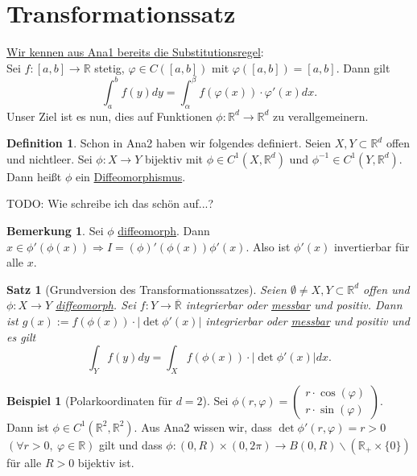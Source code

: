 \documentclass[a4paper]{scrreprt}
\newcommand{\R}{\mathbb{R}}
\newcommand{\Rq}{\overline{\R}}
\newcommand{\jlabel}[1]{\label{j_#1}}
\newcommand{\jhyperref}[2]{\hyperref[j_#1]{#2}}
\newcommand{\jlink}[1]{\jhyperref{#1}{#1}}
\newcommand{\jabb}[3]{ #1: #2 \rightarrow #3 }
\theoremstyle{plain}
\newtheorem*{satz*}{Satz}
\theoremstyle{definition}
\newtheorem*{defn*}{Definition}
\newtheorem*{expl*}{Beispiel}
\newtheorem*{bem*}{Bemerkung}
\begin{document}
{{{{    %
\section{Transformationssatz}
\uline{Wir kennen aus Ana1 bereits die Substitutionsregel}:\\
Sei $\jabb{f}{[a,b]}{\R}$ stetig, $\varphi \in C([a,b])$ mit $\varphi([a,b]) = [a,b]$. Dann gilt
\begin{displaymath}
    \int_a^b f(y) dy = \int_\alpha^\beta f(\varphi(x))\cdot \varphi'(x) dx.
\end{displaymath}
Unser Ziel ist es nun, dies auf Funktionen $\jabb{\phi}{\R^d}{\R^d}$ zu verallgemeinern.

\begin{defn*}
    \jlabel{Diffeomorphismus} \jlabel{diffeomorph}
    Schon in Ana2 haben wir folgendes definiert. Seien $X,Y\subset \R^d$ offen und nichtleer. Sei $\jabb{\phi}{X}{Y}$ bijektiv mit $\phi\in C^1(X,\R^d)$ und $\phi^{-1} \in C^1(Y,\R^d)$. Dann heißt $\phi$ ein \jlink{Diffeomorphismus}.
\end{defn*}

TODO: Wie schreibe ich das schön auf...?

\begin{bem*}
    Sei $\phi$ \jlink{diffeomorph}. Dann $x\in \phi'(\phi(x)) \Rightarrow I=(\phi)'(\phi(x))\phi'(x)$. Also ist $\phi'(x)$ invertierbar für alle $x$.
\end{bem*}


\begin{satz*}[Grundversion des Transformationssatzes]
    Seien $\emptyset \ne X,Y\subset \R^d$ offen und $\jabb{\phi}{X}{Y}$ \jlink{diffeomorph}. Sei $\jabb{f}{Y}{\Rq}$ integrierbar oder \jlink{messbar} und positiv. Dann ist $g(x):= f(\phi(x))\cdot |\det \phi'(x)|$ integrierbar oder \jlink{messbar} und positiv und es gilt
    \begin{displaymath}
        \int_Y f(y)dy = \int_X f(\phi(x)) \cdot |\det \phi'(x)|dx.
    \end{displaymath}
\end{satz*}

\begin{expl*}[Polarkoordinaten für $d=2$]
    Sei $\phi(r,\varphi) = \begin{pmatrix} r\cdot \cos (\varphi) \\ r\cdot \sin(\varphi)\end{pmatrix}$. Dann ist $\phi \in C^1(\R^2,\R^2)$. Aus Ana2 wissen wir, dass $\det \phi'(r,\varphi) = r > 0$ $(\forall r>0, \ \varphi \in \R)$ gilt und dass $\jabb{\phi}{(0,R)\times (0, 2\pi)}{B(0,R)\backslash (\R_+ \times \{0\})}$ für alle $R>0$ bijektiv ist.
    

\end{expl*}}}}}
\end{document}
